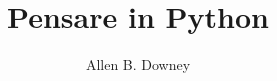 \documentclass[10pt]{book}
\title{Pensare in Python}
\author{Allen B. Downey}
\newif\ifplastex
\begin{document}
\frontmatter

\ifplastex
    \usepackage{localdef}
    \maketitle

\newcount\anchorcnt
\newcommand*{\Anchor}[1]{%
  \@bsphack%
    \Hy@GlobalStepCount\anchorcnt%
    \edef\@currentHref{anchor.\the\anchorcnt}%
    \Hy@raisedlink{\hyper@anchorstart{\@currentHref}\hyper@anchorend}%
    \M@gettitle{}\label{#1}%
    \@esphack%
}


\else

\newtheorem{exercise}{Esercizio}[chapter]



\end{document}
